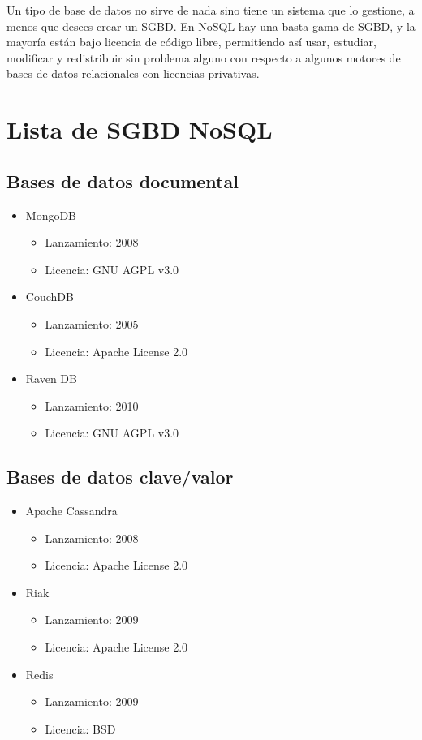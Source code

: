 Un tipo de base de datos no sirve de nada sino tiene un sistema que lo gestione, a menos que desees crear un SGBD. En NoSQL hay una basta gama de SGBD, y la mayor\'ia est\'an bajo licencia de c\'odigo libre, permitiendo as\'i usar, estudiar, modificar y redistribuir sin problema alguno con respecto a algunos motores de bases de datos relacionales con licencias privativas.

\section{Lista de SGBD NoSQL}

\subsection*{Bases de datos documental}

\begin{itemize}
\item MongoDB
    \begin{itemize}
        \item Lanzamiento: 2008
        \item Licencia: GNU AGPL v3.0
    \end{itemize}
\item CouchDB
    \begin{itemize}
        \item Lanzamiento: 2005
        \item Licencia: Apache License 2.0
    \end{itemize}
\item Raven DB
    \begin{itemize}
        \item Lanzamiento: 2010
        \item Licencia: GNU AGPL v3.0
    \end{itemize}
\end{itemize}

\subsection*{Bases de datos clave/valor}

\begin{itemize}
\item Apache Cassandra
    \begin{itemize}
        \item Lanzamiento: 2008
        \item Licencia: Apache License 2.0
    \end{itemize}
\item Riak
    \begin{itemize}
        \item Lanzamiento: 2009
        \item Licencia: Apache License 2.0
    \end{itemize}
\item Redis
    \begin{itemize}
        \item Lanzamiento: 2009
        \item Licencia: BSD
    \end{itemize}
\end{itemize}

